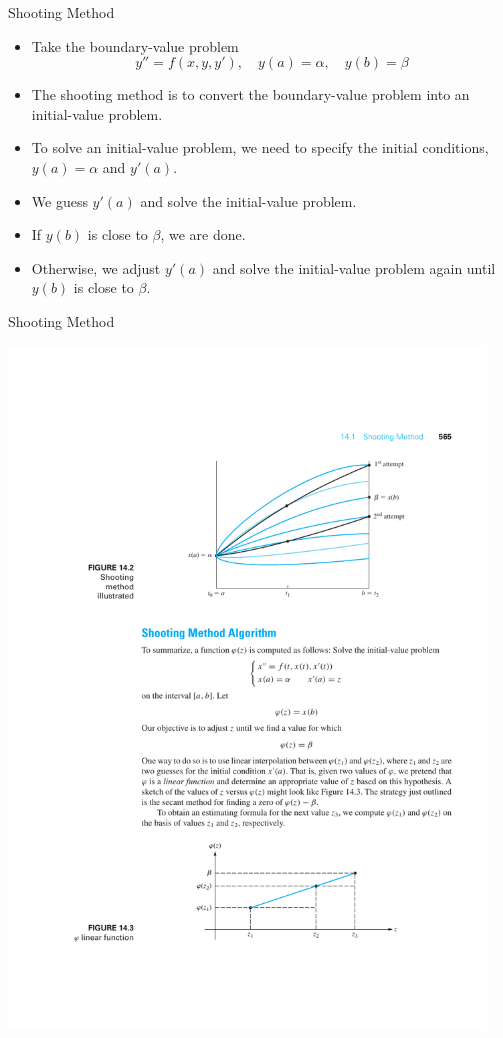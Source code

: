 \documentclass{beamer}
\begin{document}
\begin{frame}{Shooting Method}
    \begin{itemize}
        \item Take the boundary-value problem
        \[
    y'' = f(x, y, y'), \quad y(a) = \alpha, \quad y(b) = \beta
    \]
    \item The shooting method is to convert the boundary-value problem into an initial-value problem.
    \item To solve an initial-value problem, we need to specify the initial conditions, $y(a)=\alpha$ and $y'(a)$.
    \item We guess $y'(a)$ and solve the initial-value problem.
    \item If $y(b)$ is close to $\beta$, we are done.
    \item Otherwise, we adjust $y'(a)$ and solve the initial-value problem again until $y(b)$ is close to $\beta$.
    \end{itemize}
\end{frame}
\begin{frame}{Shooting Method}
    \centerline{\includegraphics[width=0.95\textwidth]{ShootingMethod.pdf}}

\end{frame}
\end{document}
